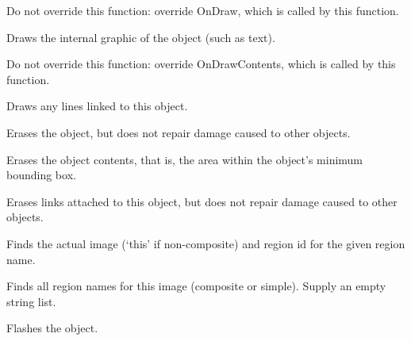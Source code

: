 Do not override this function: override OnDraw, which is called
by this function.



Draws the internal graphic of the object (such as
text).

Do not override this function: override OnDrawContents, which is called
by this function.



Draws any lines linked to this object.



Erases the object, but does not repair damage caused to other
objects.



Erases the object contents, that is, the area within the object's
minimum bounding box.



Erases links attached to this object, but does not repair
damage caused to other objects.



Finds the actual image (`this' if non-composite) and region id for the given
region name.



Finds all region names for this image (composite or simple).
Supply an empty string list.



Flashes the object.



